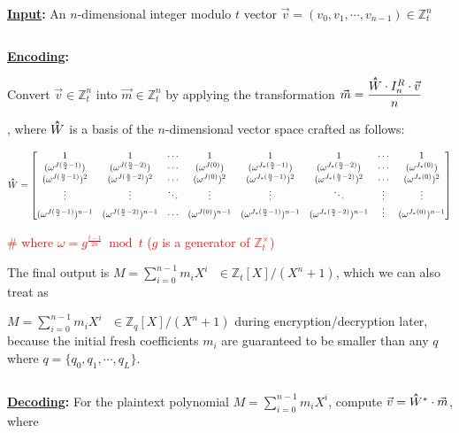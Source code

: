 \begin{tcolorbox}[title={\textbf{\tboxlabel{\ref*{subsec:bgv-encoding-decoding}} BGV's Encoding and Decoding}}]



\textbf{\underline{Input}:} An $n$-dimensional integer modulo $t$ vector $\vec{v} = (v_0, v_1, \cdots, v_{n-1}) \in \mathbb{Z}_t^n$

$ $

\textbf{\underline{Encoding}:} 

 Convert $\vec{v} \in \mathbb{Z}_t^n$ into $\vec{m} \in \mathbb{Z}_t^n$ by applying the transformation $\vec{m} = \dfrac{\hathat W \cdot I_n^R \cdot \vec{v}}{n}$

, where $\hathat W$ is a basis of the $n$-dimensional vector space crafted as follows: 

{\footnotesize{$\hathat W = \begin{bmatrix}
1 & 1 & \cdots & 1 & 1 & 1 & \cdots & 1\\
(\omega^{J(\frac{n}{2} - 1)}) & (\omega^{J(\frac{n}{2} - 2)}) & \cdots & (\omega^{J(0)}) & (\omega^{J_*(\frac{n}{2} - 1)}) & (\omega^{J_*(\frac{n}{2} - 2)}) & \cdots & (\omega^{J_*(0)})\\
(\omega^{J(\frac{n}{2} - 1)})^2 & (\omega^{J(\frac{n}{2} - 2)})^2 & \cdots & (\omega^{J(0)})^2 & (\omega^{J_*(\frac{n}{2} - 1)})^2 & (\omega^{J_*(\frac{n}{2} - 2)})^2 & \cdots & (\omega^{J_*(0)})^2 \\
\vdots & \vdots & \ddots & \vdots & \vdots & \ddots & \vdots & \vdots \\
(\omega^{J(\frac{n}{2} - 1)})^{n-1} & (\omega^{J(\frac{n}{2} - 2)})^{n-1} & \cdots & (\omega^{J(0)})^{n-1} & (\omega^{J_*(\frac{n}{2} - 1)})^{n-1} & (\omega^{J_*(\frac{n}{2} - 2)})^{n-1} & \vdots  & (\omega^{J_*(0)})^{n-1}
\end{bmatrix}$}}

\textcolor{red}{ \# where $\omega = g^{\frac{t - 1}{2n}} \bmod t$ ($g$ is a generator of $\mathbb{Z}_t^{\times}$)}

The final output is $M = \sum\limits_{i=0}^{n-1} m_iX^i \text{ } \in \mathbb{Z}_t[X] / (X^n + 1)$, 
which we can also treat as 

$M = \sum\limits_{i=0}^{n-1} m_iX^i \text{ } \in \mathbb{Z}_q[X] / (X^n + 1)$ during encryption/decryption later, because the initial fresh coefficients $m_i$ are guaranteed to be smaller than any $q$ where $q = \{q_0, q_1, \cdots, q_L\}$.

$ $

\textbf{\underline{Decoding}:} For the plaintext polynomial $M = \sum\limits_{i=0}^{n-1} m_iX^i$, 
compute $\vec{v} = \hathat W^* \cdot \vec{m}$, where 


\end{tcolorbox}
